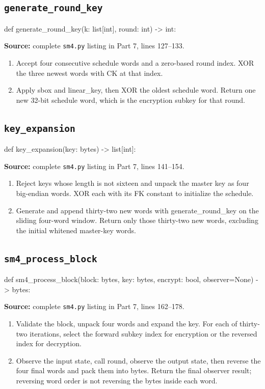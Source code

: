 \subsection{\texttt{generate\_\allowbreak{}round\_\allowbreak{}key}}
\begin{lightcode}
def generate_round_key(k: list[int], round: int) -> int:
\end{lightcode}
\noindent\textbf{Source:} complete \texttt{sm4.py} listing in Part 7, lines 127--133.
\begin{enumerate}
\item Accept four consecutive schedule words and a zero-based round index. XOR the three newest words with CK at that index.
\item Apply sbox and linear\_key, then XOR the oldest schedule word. Return one new 32-bit schedule word, which is the encryption subkey for that round.
\end{enumerate}
\subsection{\texttt{key\_\allowbreak{}expansion}}
\begin{lightcode}
def key_expansion(key: bytes) -> list[int]:
\end{lightcode}
\noindent\textbf{Source:} complete \texttt{sm4.py} listing in Part 7, lines 141--154.
\begin{enumerate}
\item Reject keys whose length is not sixteen and unpack the master key as four big-endian words. XOR each with its FK constant to initialize the schedule.
\item Generate and append thirty-two new words with generate\_round\_key on the sliding four-word window. Return only those thirty-two new words, excluding the initial whitened master-key words.
\end{enumerate}
\subsection{\texttt{sm4\_\allowbreak{}process\_\allowbreak{}block}}
\begin{lightcode}
def sm4_process_block(block: bytes, key: bytes, encrypt: bool, observer=None) -> bytes:
\end{lightcode}
\noindent\textbf{Source:} complete \texttt{sm4.py} listing in Part 7, lines 162--178.
\begin{enumerate}
\item Validate the block, unpack four words and expand the key. For each of thirty-two iterations, select the forward subkey index for encryption or the reversed index for decryption.
\item Observe the input state, call round, observe the output state, then reverse the four final words and pack them into bytes. Return the final observer result; reversing word order is not reversing the bytes inside each word.
\end{enumerate}
